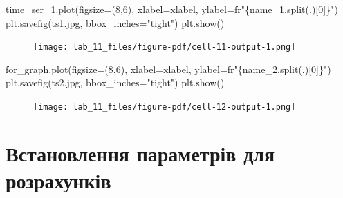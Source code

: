 \documentclass[
  letterpaper,
]{report}
\newenvironment{Shaded}{\begin{snugshade}}{\end{snugshade}}
\newcommand{\DecValTok}[1]{\textcolor[rgb]{0.68,0.00,0.00}{#1}}
\newcommand{\NormalTok}[1]{\textcolor[rgb]{0.00,0.23,0.31}{#1}}
\newcommand{\OperatorTok}[1]{\textcolor[rgb]{0.37,0.37,0.37}{#1}}
\newcommand{\SpecialCharTok}[1]{\textcolor[rgb]{0.37,0.37,0.37}{#1}}
\newcommand{\StringTok}[1]{\textcolor[rgb]{0.13,0.47,0.30}{#1}}
\newcommand{\VerbatimStringTok}[1]{\textcolor[rgb]{0.13,0.47,0.30}{#1}}
\begin{document}
\begin{Shaded}
\begin{Highlighting}[]
\NormalTok{time\_ser\_1.plot(figsize}\OperatorTok{=}\NormalTok{(}\DecValTok{8}\NormalTok{,}\DecValTok{6}\NormalTok{), xlabel}\OperatorTok{=}\NormalTok{xlabel, ylabel}\OperatorTok{=}\VerbatimStringTok{fr"}\SpecialCharTok{\{}\NormalTok{name\_1}\SpecialCharTok{.}\NormalTok{split(}\StringTok{\textquotesingle{}.\textquotesingle{}}\NormalTok{)[}\DecValTok{0}\NormalTok{]}\SpecialCharTok{\}}\VerbatimStringTok{"}\NormalTok{)}
\NormalTok{plt.savefig(}\StringTok{\textquotesingle{}ts1.jpg\textquotesingle{}}\NormalTok{, bbox\_inches}\OperatorTok{=}\StringTok{"tight"}\NormalTok{)}
\NormalTok{plt.show()}
\end{Highlighting}
\end{Shaded}

\begin{figure}[H]

{\centering \texttt{[image: lab\_11\_files/figure-pdf/cell-11-output-1.png]}

}

\end{figure}

\begin{Shaded}
\begin{Highlighting}[]
\NormalTok{for\_graph.plot(figsize}\OperatorTok{=}\NormalTok{(}\DecValTok{8}\NormalTok{,}\DecValTok{6}\NormalTok{), xlabel}\OperatorTok{=}\NormalTok{xlabel, ylabel}\OperatorTok{=}\VerbatimStringTok{fr"}\SpecialCharTok{\{}\NormalTok{name\_2}\SpecialCharTok{.}\NormalTok{split(}\StringTok{\textquotesingle{}.\textquotesingle{}}\NormalTok{)[}\DecValTok{0}\NormalTok{]}\SpecialCharTok{\}}\VerbatimStringTok{"}\NormalTok{)}
\NormalTok{plt.savefig(}\StringTok{\textquotesingle{}ts2.jpg\textquotesingle{}}\NormalTok{, bbox\_inches}\OperatorTok{=}\StringTok{"tight"}\NormalTok{)}
\NormalTok{plt.show()}
\end{Highlighting}
\end{Shaded}

\begin{figure}[H]

{\centering \texttt{[image: lab\_11\_files/figure-pdf/cell-12-output-1.png]}

}

\end{figure}

\hypertarget{ux432ux441ux442ux430ux43dux43eux432ux43bux435ux43dux43dux44f-ux43fux430ux440ux430ux43cux435ux442ux440ux456ux432-ux434ux43bux44f-ux440ux43eux437ux440ux430ux445ux443ux43dux43aux456ux432}{%
\section{Встановлення параметрів для
розрахунків}\label{ux432ux441ux442ux430ux43dux43eux432ux43bux435ux43dux43dux44f-ux43fux430ux440ux430ux43cux435ux442ux440ux456ux432-ux434ux43bux44f-ux440ux43eux437ux440ux430ux445ux443ux43dux43aux456ux432}}
\end{document}
